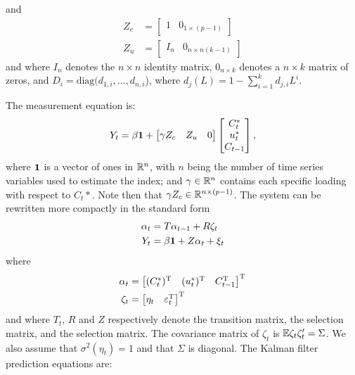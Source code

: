 and
\begin{equation}
	\begin{aligned}
		Z_c & = \begin{bmatrix}
			1 & 0_{1\times(p-1)}
		\end{bmatrix}\\
		Z_u & = \begin{bmatrix}
			I_n & 0_{n\times n (k-1)}
		\end{bmatrix}
	\end{aligned}
\end{equation}
and where $I_n$ denotes the $n\times n$ identity matrix, $0_{n\times k}$ denotes a $n\times k$ matrix of zeros, and $D_i = \text{diag}(d_{1,i}, \ldots, d_{n,i}$), where $d_j(L) = 1- \sum_{i=1}^k d_{j,i} L^i$.

The measurement equation is:
\begin{equation}
	Y_t = \beta \mathbf{1} + \begin{bmatrix}
		\gamma Z_c & Z_u & 0 
	\end{bmatrix}
	\begin{bmatrix}
		C_t^\ast\\u_t^\ast \\ C_{t-1}
	\end{bmatrix},
\end{equation}
where $\mathbf{1}$ is a vector of ones in $\mathbb{R}^n$, with $n$ being the number of time series variables used to estimate the index; and $\gamma\in \mathbb{R}^n$ contains each specific loading with respect to $C_t\ast$. Note then that $\gamma Z_c\in \mathbb{R}^{n\times (p-1)}$. The system can be rewritten more compactly in the standard form
\begin{align}
	\alpha_t & = T \alpha_{t-1} + R\zeta_t \label{eq:alpha}\\
	Y_t & = \beta \mathbf{1} + Z\alpha_t + \xi_t\label{eq:Y}
\end{align}
where
\begin{equation}
	\begin{aligned}
		\alpha_t &= \begin{bmatrix}
			(C_t^\ast)^{\scriptsize \rm T} & (u_t^\ast)^{\scriptsize \rm T} & C_{t-1}^{\scriptsize \rm T}\\
		\end{bmatrix}^{\scriptsize \rm T}\\
		\zeta_t & = \begin{bmatrix}
			\eta_t & \varepsilon_t^{\scriptsize \rm T}
		\end{bmatrix}^{\scriptsize \rm T}
	\end{aligned}
\end{equation}
and where $T_t$, $R$ and $Z$ respectively denote the transition matrix, the selection matrix, and the selection matrix. The covariance matrix of $\zeta_t$ is $\mathbb{E}\zeta_t\zeta_t'=\Sigma$. We also assume that $\sigma^2(\eta_t) = 1$ and that $\Sigma$ is diagonal. The Kalman filter prediction equations are: 

